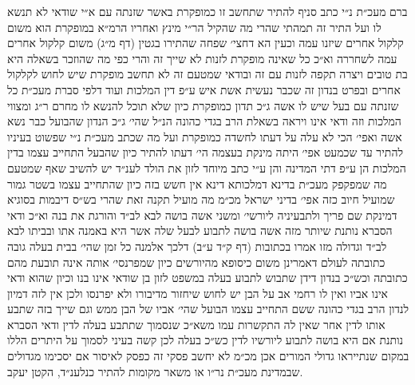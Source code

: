 \documentclass[12pt, openany]{book}
\begin{document}
\begin{multicols}{2}
ברם מעכ״ת נ״י כתב סניף להתיר שתחשב זו כמופקרת באשר שזנתה עם א״י שודאי לא תנשא לו ועל התיר זה תמהתי שהרי מה שהקיל הר״י מינץ ואחריו הרמ״א במופקרת הוא משום קלקול אחרים שיזנו עמה וכעין הא דחצי׳ שפחה שהתירו בגטין (דף מ״ג) משום קלקול אחרים עמה לשחררה וא״כ כל שאינה מופקרת לזנות לא שייך זה והרי כפי מה שהוזכר בשאלה היא בת טובים ויצרה תקפה לזנות עם זה ובודאי שמטעם זה לא תחשב מופקרת שיש לחוש לקלקול אחרים ובפרט בנדון זה שכבר נעשית אשת איש ע״פ דין המלכות ועוד דלפי סברת מעכ״ת כל שזנתה עם בעל שיש לו אשה ג״כ תדון כמופקרת כיון שלא תוכל להנשא לו מחרם ר״ג ומצווי המלכות וזה ודאי אינו ויראה בשאלת הרב בגדי כהונה הנ״ל שהי׳ ג״כ הנדון שהבועל כבר נשא אשה ואפי׳ הכי לא עלה על דעתו לחשדה כמופקרת ועל מה שכתב מעכ״ת נ״י שפשוט בעיניו להתיר עד שכמעט אפי׳ היתה מינקת בעצמה הי׳ דעתו להתיר כיון שהבעל התחייב עצמו בדין המלכות הן ע״פ דתי המדינה והן ע״י כתב מיוחד לזון את הולד לענ״ד יש להשיב שאף שמטעם מה שמפקפק מעכ״ת בדינא דמלכותא דינא אין חשש בזה כיון שהתחייב עצמו בשטר גמור שמועיל חיוב כזה אפי׳ בדיני ישראל מכ״מ מה מועיל תקנה זאת שהרי בש״ס דיבמות בסוגיא דמינקת שם פריך ולתבעיניה ליורשי׳ ומשני אשה בושה לבא לב״ד והורגת את בנה וא״כ ודאי הסברא נותנת שיותר מזה אשה בושה לתבוע לבעל שלה אשר היא באמנה אתו ובביתו לבא לב״ד וגדולה מזו אמרו בכתובות (דף ק״ד ע״ב) דלכך אלמנה כל זמן שהי׳ בבית בעלה גובה כתובתה לעולם דאמרינן משום כיסופא מהיורשים כיון שמפרנסי׳ אותה אינה תובעת מהם כתובתה וכש״כ בנדון דידן שתבוש לתבוע בעלה במשפט לזון בן שודאי אינו בנו וכיון שהוא ודאי אינו אביו ואין לו רחמי אב על הבן יש לחוש שיחזור מדיבורו ולא יפרנסו ולכן אין לזה דמיון לנדון הרב בגדי כהונה ששם התחייב עצמו הבועל שהי׳ אביו של הבן ממש וגם שייך בזה שתבע אותו לדין אחר שאין לה התקשרות עמו משא״כ שנסמוך שתתבע בעלה לדין ודאי הסברא נותנת אם היא בושה לתבוע ליורשיו לדין כש״כ בעלה לכן קשה בעיני לסמוך על היתרים הללו במקום שנתייראו גדולי המורים אכן מכ״מ לא יחשב פסקי זה כפסק לאיסור אם יסכימו מגדולים שבמדינת מעכ״ת נר״ו או משאר מקומות להתיר כנלענ״ד, הקטן יעקב.\\\vspace{0pt}

\end{multicols}\newpage
\end{document}
